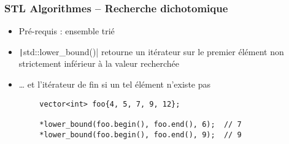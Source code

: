 \documentclass[C++.tex]{subfiles}
\begin{document}
\begin{frame}[fragile]
\end{frame}

\begin{frame}[fragile]
	\frametitle{STL Algorithmes -- Recherche dichotomique}
	\begin{itemize}
		\item Pré-requis : ensemble trié
		\item \texttt|std::lower_bound()| retourne un itérateur sur le premier élément non strictement inférieur à la valeur recherchée


		\item \ldots{} et l'itérateur de fin si un tel élément n'existe pas
	\end{itemize}

	\begin{verbatim}
		vector<int> foo{4, 5, 7, 9, 12};

		*lower_bound(foo.begin(), foo.end(), 6);  // 7
		*lower_bound(foo.begin(), foo.end(), 9);  // 9
	\end{verbatim}
\end{frame}
\end{document}
